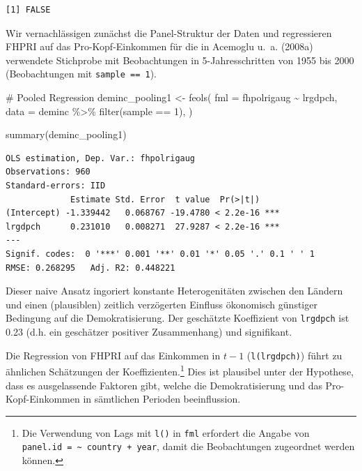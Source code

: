 \documentclass[
  a4paper,
  DIV=11,
  oneside]{scrreprt}
\newenvironment{Shaded}{\begin{snugshade}}{\end{snugshade}}
\newcommand{\AttributeTok}[1]{\textcolor[rgb]{0.40,0.45,0.13}{#1}}
\newcommand{\CommentTok}[1]{\textcolor[rgb]{0.37,0.37,0.37}{#1}}
\newcommand{\DecValTok}[1]{\textcolor[rgb]{0.68,0.00,0.00}{#1}}
\newcommand{\FunctionTok}[1]{\textcolor[rgb]{0.28,0.35,0.67}{#1}}
\newcommand{\NormalTok}[1]{\textcolor[rgb]{0.00,0.23,0.31}{#1}}
\newcommand{\OtherTok}[1]{\textcolor[rgb]{0.00,0.23,0.31}{#1}}
\newcommand{\SpecialCharTok}[1]{\textcolor[rgb]{0.37,0.37,0.37}{#1}}
\begin{document}
\begin{verbatim}
[1] FALSE
\end{verbatim}

Wir vernachlässigen zunächst die Panel-Struktur der Daten und
regressieren FHPRI auf das Pro-Kopf-Einkommen für die in Acemoglu u.~a.
(2008a) verwendete Stichprobe mit Beobachtungen in 5-Jahresschritten von
1955 bis 2000 (Beobachtungen mit \texttt{sample\ ==\ 1}).

\begin{Shaded}
\begin{Highlighting}[]
\CommentTok{\# Pooled Regression}
\NormalTok{deminc\_pooling1 }\OtherTok{\textless{}{-}} \FunctionTok{feols}\NormalTok{(}
  \AttributeTok{fml =}\NormalTok{ fhpolrigaug }\SpecialCharTok{\textasciitilde{}}\NormalTok{ lrgdpch,}
  \AttributeTok{data =}\NormalTok{ deminc }\SpecialCharTok{\%\textgreater{}\%} 
    \FunctionTok{filter}\NormalTok{(sample }\SpecialCharTok{==} \DecValTok{1}\NormalTok{), }
\NormalTok{)}

\FunctionTok{summary}\NormalTok{(deminc\_pooling1)}
\end{Highlighting}
\end{Shaded}

\begin{verbatim}
OLS estimation, Dep. Var.: fhpolrigaug
Observations: 960
Standard-errors: IID 
             Estimate Std. Error  t value  Pr(>|t|)    
(Intercept) -1.339442   0.068767 -19.4780 < 2.2e-16 ***
lrgdpch      0.231010   0.008271  27.9287 < 2.2e-16 ***
---
Signif. codes:  0 '***' 0.001 '**' 0.01 '*' 0.05 '.' 0.1 ' ' 1
RMSE: 0.268295   Adj. R2: 0.448221
\end{verbatim}

Dieser naive Ansatz ingoriert konstante Heterogenitäten zwischen den
Ländern und einen (plausiblen) zeitlich verzögerten Einfluss ökonomisch
günstiger Bedingung auf die Demokratisierung. Der geschätzte Koeffizient
von \texttt{lrgdpch} ist 0.23 (d.h. ein geschätzer positiver
Zusammenhang) und signifikant.

Die Regression von FHPRI auf das Einkommen in \(t-1\)
(\texttt{l(lrgdpch)}) führt zu ähnlichen Schätzungen der
Koeffizienten.\footnote{Die Verwendung von Lags mit \texttt{l()} in
  \texttt{fml} erfordert die Angabe von
  \texttt{panel.id\ =\ \textasciitilde{}\ country\ +\ year}, damit die
  Beobachtungen zugeordnet werden können.} Dies ist plausibel unter der
Hypothese, dass es ausgelassende Faktoren gibt, welche die
Demokratisierung und das Pro-Kopf-Einkommen in sämtlichen Perioden
beeinflussion.
\end{document}
